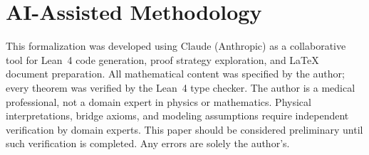 \documentclass[11pt,a4paper]{article}
\theoremstyle{plain}
\theoremstyle{definition}
\begin{document}
\section{AI-Assisted Methodology}\label{sec:ai}

This formalization was developed using Claude (Anthropic) as a
collaborative tool for Lean~4 code generation, proof strategy
exploration, and \LaTeX{} document preparation.  All mathematical
content was specified by the author; every theorem was verified
by the Lean~4 type checker.
The author is a medical professional, not a domain expert in physics
or mathematics.  Physical interpretations, bridge axioms, and modeling
assumptions require independent verification by domain experts.
This paper should be considered preliminary until such verification
is completed.  Any errors are solely the author's.
\end{document}
